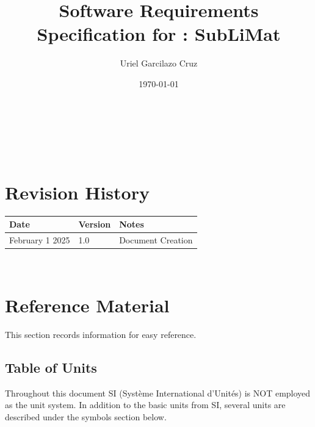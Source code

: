 \documentclass[12pt]{article}
\begin{document}
\title{Software Requirements Specification for \progname: SubLiMat} 
\author{Uriel Garcilazo Cruz}
\date{\today}
	
\maketitle

~\newpage


\tableofcontents

~\newpage

\section*{Revision History}

\begin{tabularx}{\textwidth}{p{3cm}p{2cm}X}
\toprule {\bf Date} & {\bf Version} & {\bf Notes}\\
\midrule
February 1 2025 & 1.0 & Document Creation\\
\bottomrule
\end{tabularx}


~\newpage

\section{Reference Material}

This section records information for easy reference.

\subsection{Table of Units}

Throughout this document SI (Syst\`{e}me International d'Unit\'{e}s) is NOT employed
as the unit system.  In addition to the basic units from SI, several units
are described under the symbols section below.

~\newline
\end{document}
